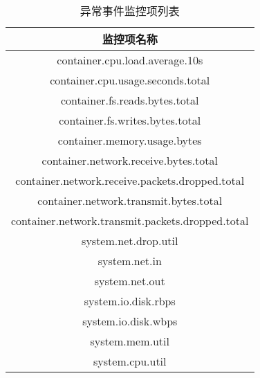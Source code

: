 \begin{table}[htbp]
    \centering
    \caption{异常事件监控项列表}
    \label{kpi-event}
    \begin{tabular}{c}
    \toprule[1.5pt]
    监控项名称                                         \\ \midrule[1.5pt]
    container.cpu.load.average.10s                   \\
    container.cpu.usage.seconds.total                \\
    container.fs.reads.bytes.total                   \\
    container.fs.writes.bytes.total                  \\
    container.memory.usage.bytes                     \\
    container.network.receive.bytes.total            \\
    container.network.receive.packets.dropped.total  \\
    container.network.transmit.bytes.total           \\
    container.network.transmit.packets.dropped.total \\
    system.net.drop.util                             \\
    system.net.in                                    \\
    system.net.out                                   \\
    system.io.disk.rbps                              \\
    system.io.disk.wbps                              \\
    system.mem.util                                  \\
    system.cpu.util                                  \\ \bottomrule[1.5pt]
    \end{tabular}
    \end{table}

